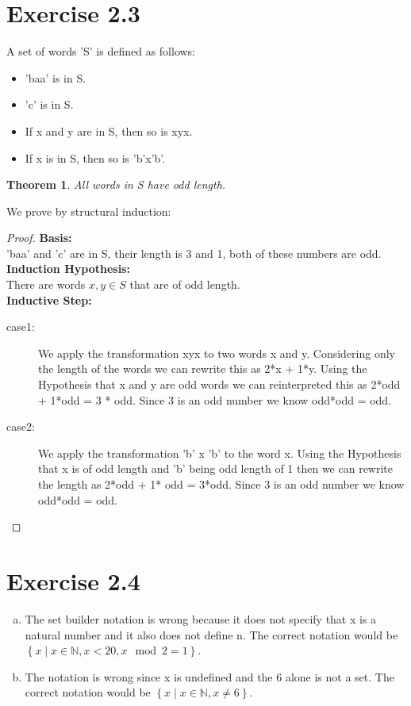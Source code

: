 \documentclass{article} %
\newtheorem{theorem}{Theorem}
\newcommand{\homeworkNumber}{2}
\begin{document}
\section*{Exercise \homeworkNumber.3}
A set of words 'S' is defined as follows:
\begin{itemize}
	\item
	      'baa' is in S.
	\item
	      'c' is in S.
	\item
	      If x and y are in S, then so is xyx.
	\item
	      If x is in S, then so is 'b'x'b'.
\end{itemize}
\begin{theorem}
	All words in S have odd length.
\end{theorem}
We prove by structural induction:
\begin{proof}
	\textbf{Basis:}\\
	'baa' and 'c' are in S, their length is 3 and 1, both of these numbers are odd.\\[10pt]
	\textbf{Induction Hypothesis:}\\
	There are words $x,y \in S$ that are of odd length.\\[10pt]
	\textbf{Inductive Step:}
	\begin{description}
		\item[case1:] We apply the transformation xyx to two words x and y.
			Considering only the length of the words we can rewrite this as 2*x + 1*y.
			Using the Hypothesis that x and y are odd words we can reinterpreted this as 2*odd + 1*odd = 3 * odd.
			Since 3 is an odd number we know odd*odd = odd.
		\item[case2:] We apply the transformation 'b' x 'b' to the word x.
			Using the Hypothesis that x is of odd length and 'b' being odd length of 1 then we can rewrite the length as 2*odd + 1* odd = 3*odd.
			Since 3 is an odd number we know odd*odd = odd.
	\end{description}

\end{proof}
\newpage

\section*{Exercise \homeworkNumber.4}
\begin{enumerate}[(a)]
	\item The set builder notation is wrong because it does not specify that x is a natural number and it also does not define n.
	      The correct notation would be \(\left\{ x \mid x \in \mathbb{N}, x < 20, x \mod 2 = 1 \right\}\).
	\item The notation is wrong since x is undefined and the 6 alone is not a set.
	      The correct notation would be \( \left\{ x \mid x \in \mathbb{N}, x \neq 6 \right\} \).
\end{enumerate}
\newpage
\end{document}
